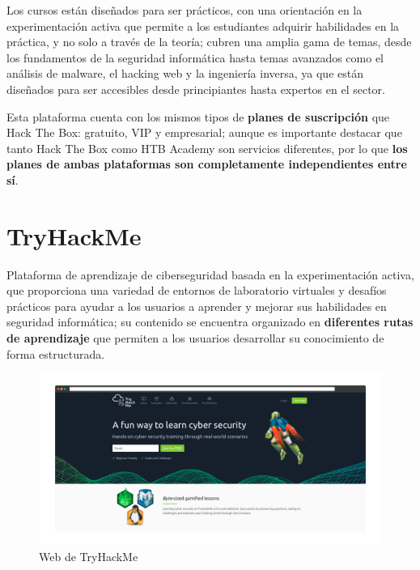     Los cursos están diseñados para ser prácticos, con una orientación en la experimentación activa que permite a los estudiantes adquirir habilidades en la práctica, y no solo a través de la teoría; cubren una amplia gama de temas, desde los fundamentos de la seguridad informática hasta temas avanzados como el análisis de malware, el hacking web y la ingeniería inversa, ya que están diseñados para ser accesibles desde principiantes hasta expertos en el sector.
    
    Esta plataforma cuenta con los mismos tipos de \textbf{planes de suscripción} que Hack The Box: gratuito, VIP y empresarial; aunque es importante destacar que tanto Hack The Box como HTB Academy son servicios diferentes, por lo que \textbf{los planes de ambas plataformas son completamente independientes entre sí}.
    
    \newpage
    
    
    \section{TryHackMe}
    
    Plataforma de aprendizaje de ciberseguridad basada en la experimentación activa, que proporciona una variedad de entornos de laboratorio virtuales y desafíos prácticos para ayudar a los usuarios a aprender y mejorar sus habilidades en seguridad informática; su contenido se encuentra organizado en \textbf{diferentes rutas de aprendizaje} que permiten a los usuarios desarrollar su conocimiento de forma estructurada.
    
    \begin{figure}[h]
        \centering
        \includegraphics[width=\textwidth]{images/Capturas/Web de THM.png}
        \caption{Web de TryHackMe}
        \label{fig:THM-web}
    \end{figure}
    
